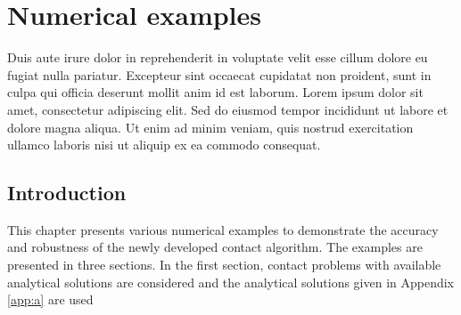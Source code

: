 %
\chapter{Numerical examples}
\label{c:3}
%
%
Duis aute irure dolor in reprehenderit in voluptate velit esse cillum dolore eu fugiat nulla pariatur.
Excepteur sint occaecat cupidatat non proident, sunt in culpa qui officia deserunt mollit anim id est laborum.
Lorem ipsum dolor sit amet, consectetur adipiscing elit. 
Sed do eiusmod tempor incididunt ut labore et dolore magna aliqua. 
Ut enim ad minim veniam, quis nostrud exercitation ullamco laboris nisi ut aliquip ex ea commodo consequat.
%
%
%
\section{Introduction}
\label{sec:ne:intro}
%
%
%
This chapter presents various numerical examples to demonstrate the accuracy and robustness of the newly developed contact algorithm. The examples are presented in three sections. In the first section, contact problems with available analytical solutions are considered and the analytical solutions given in Appendix \ref{app:a} are used 
%
%
%
